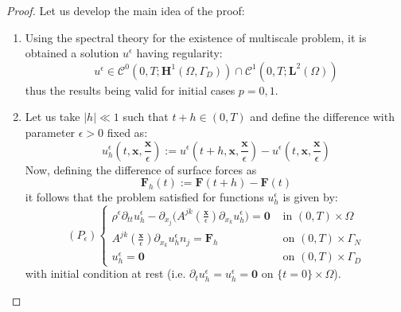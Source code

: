 \begin{proof}
Let us develop the main idea of the proof:\\
\begin{enumerate}
    \item Using the spectral theory for the existence of multiscale problem, it is obtained a solution $u^{\epsilon}$ having regularity:
    \begin{equation*}
        u^{\epsilon} \in \mathcal{C}^0(0,T;\mathbf{H}^1(\Omega, \Gamma_D)) \cap \mathcal{C}^1(0,T;\mathbf{L}^2(\Omega))
    \end{equation*}
    thus the results being valid for initial cases $p = 0, 1$.
    \item Let us take $\vert h \vert \ll 1$ such that $t+h \in (0,T)$ and define the difference with parameter $\epsilon > 0$ fixed as:
    \begin{equation*}
        u_h^{\epsilon}(t, \mathbf{x}, \frac{\mathbf{x}}{\epsilon}) := u^{\epsilon} (t+h, \mathbf{x}, \frac{\mathbf{x}}{\epsilon}) - u^{\epsilon}(t, \mathbf{x}, \frac{\mathbf{x}}{\epsilon})
    \end{equation*}
    Now, defining the difference of surface forces as
    \begin{equation*}
        \mathbf{F}_h(t):= \mathbf{F}(t+h) - \mathbf{F}(t)
    \end{equation*}
    it follows that the problem satisfied for functions $u_h^{\epsilon}$ is given by:
    \begin{equation*}
        (P_{\epsilon}) \left \{
        \begin{array}{cc}
            \rho^{\epsilon} \partial_{tt} u_h^{\epsilon} - \partial_{x_j} \big( A^{jk}(\frac{\mathbf{x}}{\epsilon}) \partial_{x_k} u_h^{\epsilon} \big) = \mathbf{0}  &  \text{ in } (0,T)\times \Omega \\
            A^{jk}(\frac{\mathbf{x}}{\epsilon}) \partial_{x_k} u_h^{\epsilon}n_j = \mathbf{F}_h & \text{ on } (0,T)\times \Gamma_N \\
            u^{\epsilon}_h = \mathbf{0} & \text{ on }(0,T)\times \Gamma_D
        \end{array}
        \right .
    \end{equation*}
    with initial condition at rest (i.e. $\partial_t u_h^{\epsilon} = u_h^{\epsilon} = \mathbf{0}$ on $\{t=0\} \times \Omega$).
    

\end{enumerate}
\end{proof}
